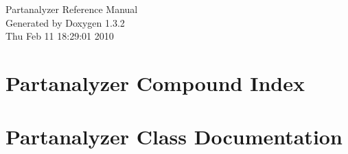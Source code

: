 \documentclass[a4paper]{book}
\begin{document}
\begin{titlepage}
\vspace*{7cm}
\begin{center}
{\Large Partanalyzer Reference Manual}\\
\vspace*{1cm}
{\large Generated by Doxygen 1.3.2}\\
\vspace*{0.5cm}
{\small Thu Feb 11 18:29:01 2010}\\
\end{center}
\end{titlepage}
\clearemptydoublepage
{}
\tableofcontents
\clearemptydoublepage
{}
\chapter{Partanalyzer Compound Index}

\chapter{Partanalyzer Class Documentation}












\printindex
\end{document}
